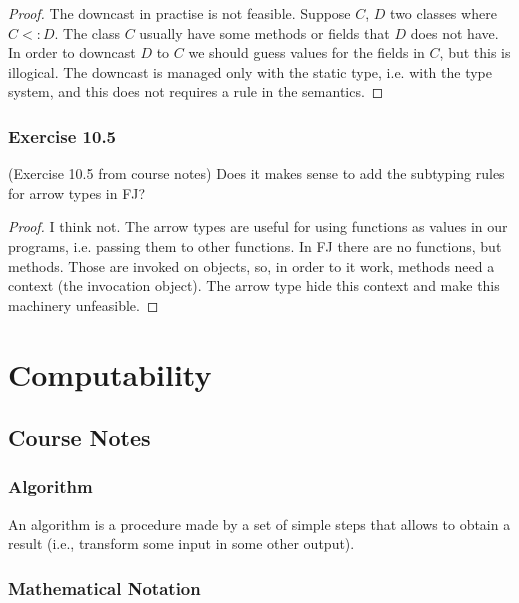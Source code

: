 \documentclass[12pt,a4paper,oneside]{book}
\begin{document}
\begin{proof}
	The downcast in practise is not feasible. Suppose $C$, $D$ two classes where $C <: D$. The class $C$ usually have some methods or fields that $D$ does not have. In order to downcast $D$ to $C$ we should guess values for the fields in $C$, but this is illogical. The downcast is managed only with the static type, i.e. with the type system, and this does not requires a rule in the semantics. 
\end{proof}

\subsection{Exercise 10.5}

\begin{exercise}{(Exercise 10.5 from course notes)}
	Does it makes sense to add the subtyping rules for arrow types in FJ?
\end{exercise}

\begin{proof}
	I think not. The arrow types are useful for using functions as values in our programs, i.e. passing them to other functions. In FJ there are no functions, but methods. Those are invoked on objects, so, in order to it work, methods need a context (the invocation object). The arrow type hide this context and make this machinery unfeasible.
\end{proof}



\chapter{Computability}

\section{Course Notes}

\subsection{Algorithm} 

An algorithm is a procedure made by a set of simple steps that allows
to obtain a result (i.e., transform some input in some other output).

\subsection{Mathematical Notation}
\end{document}
